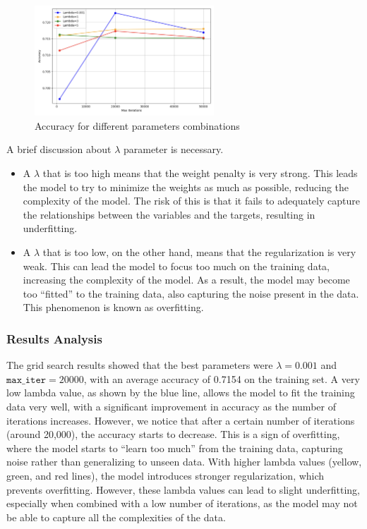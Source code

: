 \documentclass[a4paper, 10pt]{article}
\begin{document}
\begin{figure}[H]
    \centering
    \includegraphics[width=0.6\textwidth]{images/accSVM.png}
    \caption{Accuracy for different parameters combinations}
    \label{fig:accSVM}
\end{figure}

A brief discussion about \(\lambda\) parameter is necessary. 
\begin{itemize}
    \item A \(\lambda\) that is too high means that the weight penalty is very strong. This leads the model to try to minimize the weights as much as possible, reducing the complexity of the model. The risk of this is that it fails to adequately capture the relationships between the variables and the targets, resulting in underfitting.
    \item A \(\lambda\) that is too low, on the other hand, means that the regularization is very weak. This can lead the model to focus too much on the training data, increasing the complexity of the model. As a result, the model may become too “fitted” to the training data, also capturing the noise present in the data. This phenomenon is known as overfitting.
\end{itemize}

\subsubsection{Results Analysis}

The grid search results showed that the best parameters were \(\lambda = 0.001\) and \(\texttt{max\_iter} = 20000\), with an average accuracy of 0.7154 on the training set. 
A very low lambda value, as shown by the blue line, allows the model to fit the training data very well, with a significant improvement in accuracy as the number of iterations increases. However, we notice that after a certain number of iterations (around 20,000), the accuracy starts to decrease. This is a sign of overfitting, where the model starts to “learn too much” from the training data, capturing noise rather than generalizing to unseen data.
With higher lambda values (yellow, green, and red lines), the model introduces stronger regularization, which prevents overfitting. However, these lambda values can lead to slight underfitting, especially when combined with a low number of iterations, as the model may not be able to capture all the complexities of the data.
\end{document}

